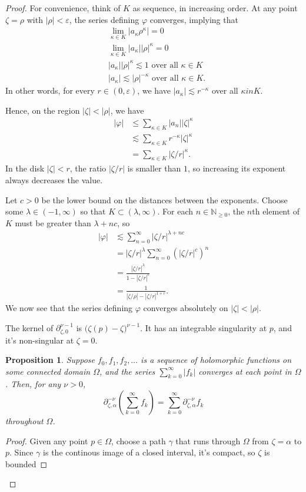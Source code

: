 \documentclass{article}
\theoremstyle{definition}
\theoremstyle{plain}
\newtheorem{prop}[definition]{Proposition}
\newenvironment{verify}{\color{ForestGreen}}{\color{black}}
\begin{document}
{\begin{proof}
\begin{verify}
For convenience, think of $K$ as sequence, in increasing order. At any point $\zeta = \rho$ with $|\rho| < \varepsilon$, the series defining $\varphi$ converges, implying that
\begin{align*}
& \lim_{\kappa \in K} |a_\kappa \rho^\kappa| = 0 \\
& \lim_{\kappa \in K} |a_\kappa| |\rho|^\kappa = 0 \\
& |a_\kappa| |\rho|^\kappa \lesssim 1 \text{ over all } \kappa \in K \\
& |a_\kappa| \lesssim |\rho|^{-\kappa} \text{ over all } \kappa \in K.
\end{align*}
In other words, for every $r \in (0, \varepsilon)$, we have $|a_\kappa| \lesssim r^{-\kappa}$ over all $\kappa in K$.

Hence, on the region $|\zeta| < |\rho|$, we have
\begin{align*}
|\varphi| & \le \sum_{\kappa \in K} |a_n| |\zeta|^\kappa \\
& \lesssim \sum_{\kappa \in K} r^{-\kappa} |\zeta|^\kappa \\
& = \sum_{\kappa \in K} |\zeta/r|^\kappa.
\end{align*}
In the disk $|\zeta| < r$, the ratio $|\zeta/r|$ is smaller than $1$, so increasing its exponent always decreases the value.

Let $c > 0$ be the lower bound on the distances between the exponents. Choose some $\lambda \in (-1, \infty)$ so that $K \subset (\lambda, \infty)$. For each $n \in \mathbb{N}_{\ge 0}$, the $n$th element of $K$ must be greater than $\lambda + nc$, so
\begin{align*}
|\varphi| & \lesssim \sum_{n = 0}^\infty |\zeta/r|^{\lambda + nc} \\
& = |\zeta/r|^\lambda \sum_{n = 0}^\infty (|\zeta/r|^c)^n \\
& = \frac{|\zeta/r|^\lambda}{1 - |\zeta/r|^c} \\
& = \frac{1}{|\zeta/\rho| - |\zeta/r|^{1+c}}.
\end{align*}
We now see that the series defining $\varphi$ converges absolutely on $|\zeta| < |\rho|$.

The kernel of $\partial_{\zeta, 0}^{\nu-1}$ is $\big(\zeta(p) - \zeta\big)^{\nu-1}$. It has an integrable singularity at $p$, and it's non-singular at $\zeta = 0$.
\end{verify}

\begin{prop}
Suppose $f_0, f_1, f_2, \ldots$ is a sequence of holomorphic functions on some connected domain $\Omega$, and the series $\sum_{k=0}^\infty |f_k|$ converges at each point in $\Omega$. Then, for any $\nu > 0$,
\[ \partial_{\zeta, \alpha}^{-\nu} \left( \sum_{k=0}^\infty f_k \right) = \sum_{k=0}^\infty \partial_{\zeta, \alpha}^{-\nu} f_k \]
throughout $\Omega$.
\end{prop}
\begin{proof}
Given any point $p \in \Omega$, choose a path $\gamma$ that runs through $\Omega$ from $\zeta = \alpha$ to $p$. Since $\gamma$ is the continous image of a closed interval, it's compact, so $\zeta$ is bounded


\end{proof}
\end{proof}}
\end{document}
